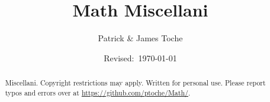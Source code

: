 \documentclass[12pt]{article}
\title{Math Miscellani}
\author{Patrick \& James Toche}
\date{Revised:~\today}
\begin{document}
\maketitle
\begin{minipage}{\textwidth}
\begin{abstract}\setlength{\parindent}{0pt}%
Miscellani.
Copyright restrictions may apply. Written for personal use. 
Please report typos and errors over at \url{https://github.com/ptoche/Math/}. 
\end{abstract}
\end{minipage}

\thispagestyle{empty}
\clearpage

\section[Problem]{}\nopagebreak


\section[Problem]{}\nopagebreak


\section[Problem]{}\nopagebreak


\section[Problem]{}\nopagebreak


\section[Problem]{}\nopagebreak

\end{document}
